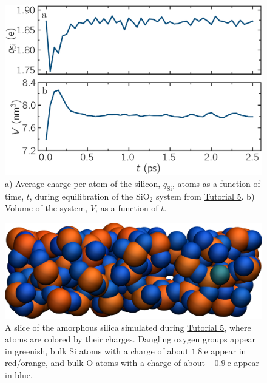 \documentclass[9pt,tutorial]{livecoms}
\begin{document}
\begin{figure}
\centering
\includegraphics[width=\linewidth]{SIO-charge}
\caption{a) Average charge per atom of the silicon, $q_\text{Si}$, atoms as
a function of time, $t$, during equilibration of the $\text{SiO}_2$ system
from \hyperref[reactive-silicon-dioxide-label]{Tutorial 5}.  b) Volume of the
system, $V$, as a function of $t$.}
\label{fig:SIO-charge}
\end{figure}

\begin{figure}
\includegraphics[width=\linewidth]{SIO-slice}
\caption{A slice of the amorphous silica simulated during
\hyperref[reactive-silicon-dioxide-label]{Tutorial 5}, where atoms are colored by their charges.
Dangling oxygen groups appear in greenish, bulk Si atoms with a charge of about
$1.8~\text{e}$  appear in red/orange, and bulk O atoms with a charge of about
$-0.9~\text{e}$ appear in blue.}
\label{fig:SIO-slice}
\end{figure}
\end{document}
